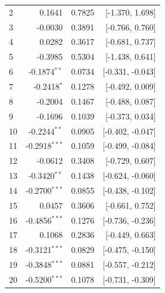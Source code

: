 \begin{longtable}{lrrr}
2 & 0.1641 & 0.7825 & [-1.370, 1.698] \\
3 & -0.0030 & 0.3891 & [-0.766, 0.760] \\
4 & 0.0282 & 0.3617 & [-0.681, 0.737] \\
5 & -0.3985 & 0.5304 & [-1.438, 0.641] \\
6 & -0.1874$^{**}$ & 0.0734 & [-0.331, -0.043] \\
7 & -0.2418$^{*}$ & 0.1278 & [-0.492, 0.009] \\
8 & -0.2004 & 0.1467 & [-0.488, 0.087] \\
9 & -0.1696 & 0.1039 & [-0.373, 0.034] \\
10 & -0.2244$^{**}$ & 0.0905 & [-0.402, -0.047] \\
11 & -0.2918$^{***}$ & 0.1059 & [-0.499, -0.084] \\
12 & -0.0612 & 0.3408 & [-0.729, 0.607] \\
13 & -0.3420$^{**}$ & 0.1438 & [-0.624, -0.060] \\
14 & -0.2700$^{***}$ & 0.0855 & [-0.438, -0.102] \\
15 & 0.0457 & 0.3606 & [-0.661, 0.752] \\
16 & -0.4856$^{***}$ & 0.1276 & [-0.736, -0.236] \\
17 & 0.1068 & 0.2836 & [-0.449, 0.663] \\
18 & -0.3121$^{***}$ & 0.0829 & [-0.475, -0.150] \\
19 & -0.3848$^{***}$ & 0.0881 & [-0.557, -0.212] \\
20 & -0.5200$^{***}$ & 0.1078 & [-0.731, -0.309] \\
\end{longtable}
